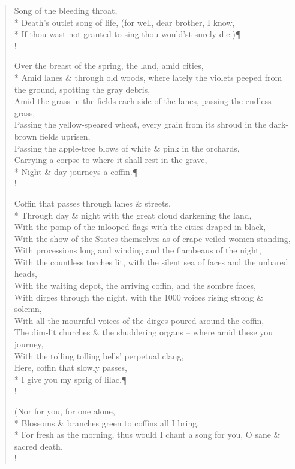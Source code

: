 \documentclass[MAIN]{subfiles}
\begin{document}
\begin{verse}
Song of the bleeding throat,\\*
Death's outlet song of life, (for well, dear brother, I know,\\*
If thou wast not granted to sing thou would'st surely die.)\P\\!

Over the breast of the spring, the land, amid cities,\\*
Amid lanes \& through old woods, where lately the violets peeped from the ground, spotting the gray debris,\\
Amid the grass in the fields each side of the lanes, passing the endless grass,\\
Passing the yellow-speared wheat, every grain from its shroud in the dark-brown fields uprisen,\\
Passing the apple-tree blows of white \& pink in the orchards,\\
Carrying a corpse to where it shall rest in the grave,\\*
Night \& day journeys a coffin.\P\\!

Coffin that passes through lanes \& streets,\\*
Through day \& night with the great cloud darkening the land,\\
With the pomp of the inlooped flags with the cities draped in black,\\
With the show of the States themselves as of crape-veiled women standing,\\
With processions long and winding and the flambeaus of the night,\\
With the countless torches lit, with the silent sea of faces and the unbared heads,\\
With the waiting depot, the arriving coffin, and the sombre faces,\\
With dirges through the night, with the 1000 voices rising strong \& solemn,\\
With all the mournful voices of the dirges poured around the coffin,\\
The dim-lit churches \& the shuddering organs -- where amid these you journey,\\
With the tolling tolling bells' perpetual clang,\\ 
Here, coffin that slowly passes,\\*
I give you my sprig of lilac.\P\\!

(Nor for you, for one alone,\\*
Blossoms \& branches green to coffins all I bring,\\*
For fresh as the morning, thus would I chant a song for you, O sane \& sacred death.\\!


\end{verse}
\end{document}
